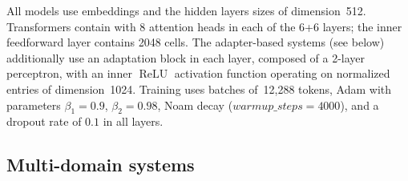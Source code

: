 All models use embeddings and the hidden layers sizes of dimension~512. Transformers contain with 8 attention heads in each of the 6+6 layers; the inner feedforward layer contains 2048 cells. The adapter-based systems (see below) additionally use an adaptation block in each layer, composed of a 2-layer perceptron, with an inner $\operatorname{ReLU}$ activation function operating on normalized entries of dimension~1024. 
Training uses batches of~12,288 tokens, Adam with parameters $\beta_1=0.9$, $\beta_2= 0.98$, Noam decay ($warmup\_steps=4000$), and a dropout rate of $0.1$ in all layers.

\subsection{Multi-domain systems \label{ssec:systems-chap4}}

